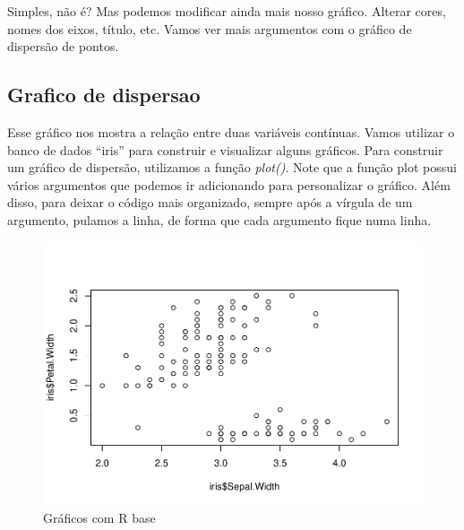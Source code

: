 \documentclass[
]{book}
\newenvironment{Shaded}{\begin{snugshade}}{\end{snugshade}}
\newcommand{\CommentTok}[1]{\textcolor[rgb]{0.56,0.35,0.01}{\textit{#1}}}
\newcommand{\FunctionTok}[1]{\textcolor[rgb]{0.13,0.29,0.53}{\textbf{#1}}}
\newcommand{\NormalTok}[1]{#1}
\newcommand{\SpecialCharTok}[1]{\textcolor[rgb]{0.81,0.36,0.00}{\textbf{#1}}}
\begin{document}
Simples, não é? Mas podemos modificar ainda mais nosso gráfico. Alterar cores, nomes dos eixos, título, etc. Vamos ver mais argumentos com o gráfico de dispersão de pontos.

\hypertarget{grafico-de-dispersao}{%
\subsection{Grafico de dispersao}\label{grafico-de-dispersao}}

Esse gráfico nos mostra a relação entre duas variáveis contínuas. Vamos utilizar o banco de dados ``iris'' para construir e visualizar alguns gráficos. Para construir um gráfico de dispersão, utilizamos a função \emph{plot()}. Note que a função plot possui vários argumentos que podemos ir adicionando para personalizar o gráfico. Além disso, para deixar o código mais organizado, sempre após a vírgula de um argumento, pulamos a linha, de forma que cada argumento fique numa linha.

\begin{Shaded}
\end{Shaded}

\begin{figure}
\centering
\includegraphics{_main_files/figure-latex/nome-do-chunk2-1.pdf}
\caption{\label{fig:nome-do-chunk2-1}Gráficos com R base}
\end{figure}
\end{document}

